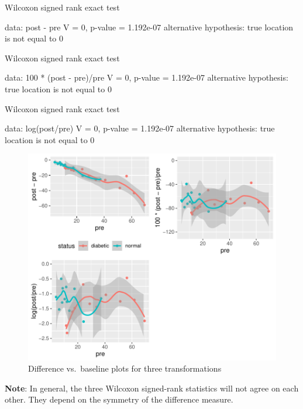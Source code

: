 \begin{Schunk}
\begin{Soutput}
	Wilcoxon signed rank exact test

data:  post - pre
V = 0, p-value = 1.192e-07
alternative hypothesis: true location is not equal to 0


	Wilcoxon signed rank exact test

data:  100 * (post - pre)/pre
V = 0, p-value = 1.192e-07
alternative hypothesis: true location is not equal to 0


	Wilcoxon signed rank exact test

data:  log(post/pre)
V = 0, p-value = 1.192e-07
alternative hypothesis: true location is not equal to 0
\end{Soutput}
\begin{figure}[htbp]

\centerline{\includegraphics[width=\maxwidth]{change-analysis-1} }

\caption[Difference vs]{Difference vs.\ baseline plots for three transformations}\label{fig:change-analysis}
\end{figure}
\end{Schunk}
\textbf{Note}: In general, the three Wilcoxon signed-rank statistics
will not agree on each other.  They depend on the symmetry of the
difference measure.
\nocite{kai89,tor85how,mar85mod,kro93spu,col00sym}


